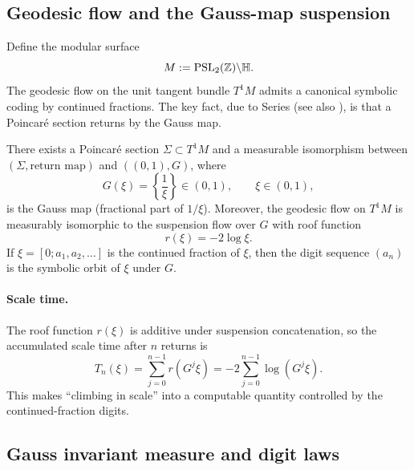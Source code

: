 \subsection{Geodesic flow and the Gauss-map suspension}
\label{sec:geodesic_flow_gauss}

Define the modular surface
\begin{equation}
M:=\mathrm{PSL}_2(\mathbb{Z})\backslash\mathbb{H}.
\end{equation}
The geodesic flow on the unit tangent bundle $T^1M$ admits a canonical symbolic coding by continued fractions. The key fact, due to Series \cite{Series1985} (see also \cite{KatokHasselblatt1995,IosifescuKraaikamp2002}), is that a Poincar\'e section returns by the Gauss map.

\begin{theorem}
\label{thm:series_suspension}
There exists a Poincar\'e section $\Sigma\subset T^1M$ and a measurable isomorphism between $(\Sigma,\text{return map})$ and $((0,1),G)$, where
\begin{equation}
G(\xi)=\left\{\frac{1}{\xi}\right\}\in(0,1),\qquad \xi\in(0,1),
\end{equation}
is the Gauss map (fractional part of $1/\xi$). Moreover, the geodesic flow on $T^1M$ is measurably isomorphic to the suspension flow over $G$ with roof function
\begin{equation}
r(\xi)=-2\log \xi.
\end{equation}
If $\xi=[0;a_1,a_2,\dots]$ is the continued fraction of $\xi$, then the digit sequence $(a_n)$ is the symbolic orbit of $\xi$ under $G$.
\end{theorem}

\paragraph{Scale time.}
The roof function $r(\xi)$ is additive under suspension concatenation, so the accumulated scale time after $n$ returns is
\begin{equation}
T_n(\xi)=\sum_{j=0}^{n-1} r(G^j\xi)= -2\sum_{j=0}^{n-1}\log(G^j\xi).
\end{equation}
This makes ``climbing in scale'' into a computable quantity controlled by the continued-fraction digits.

\subsection{Gauss invariant measure and digit laws}
\label{sec:gauss_measure_digit_law}

